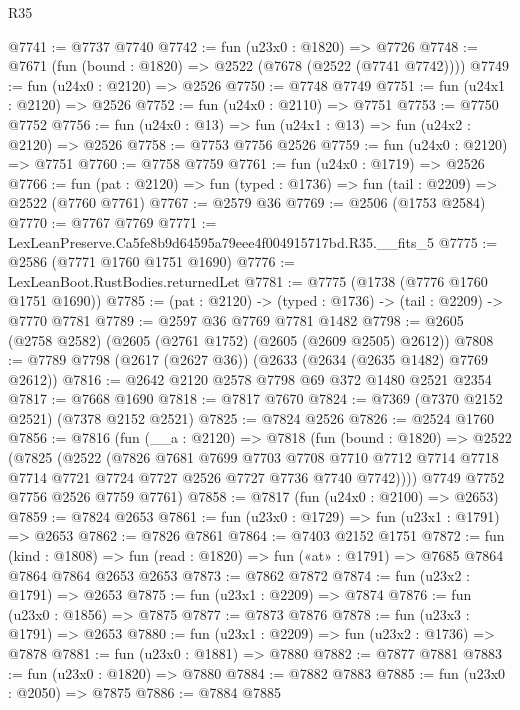 \begin{lexlean}{R35}
\begin{coremodule}
@7741 := @7737 @7740
@7742 := fun (u23x0 : @1820) => @7726
@7748 := @7671 (fun (bound : @1820) => @2522 (@7678 (@2522 (@7741 @7742))))
@7749 := fun (u24x0 : @2120) => @2526
@7750 := @7748 @7749
@7751 := fun (u24x1 : @2120) => @2526
@7752 := fun (u24x0 : @2110) => @7751
@7753 := @7750 @7752
@7756 := fun (u24x0 : @13) => fun (u24x1 : @13) => fun (u24x2 : @2120) => @2526
@7758 := @7753 @7756 @2526
@7759 := fun (u24x0 : @2120) => @7751
@7760 := @7758 @7759
@7761 := fun (u24x0 : @1719) => @2526
@7766 := fun (pat : @2120) => fun (typed : @1736) => fun (tail : @2209) => @2522 (@7760 @7761)
@7767 := @2579 @36
@7769 := @2506 (@1753 @2584)
@7770 := @7767 @7769
@7771 := LexLeanPreserve.Ca5fe8b9d64595a79eee4f004915717bd.R35.__fits_5
@7775 := @2586 (@7771 @1760 @1751 @1690)
@7776 := LexLeanBoot.RustBodies.returnedLet
@7781 := @7775 (@1738 (@7776 @1760 @1751 @1690))
@7785 := (pat : @2120) -> (typed : @1736) -> (tail : @2209) -> @7770 @7781
@7789 := @2597 @36 @7769 @7781 @1482
@7798 := @2605 (@2758 @2582) (@2605 (@2761 @1752) (@2605 (@2609 @2505) @2612))
@7808 := @7789 @7798 (@2617 (@2627 @36)) (@2633 (@2634 (@2635 @1482) @7769 @2612))
@7816 := @2642 @2120 @2578 @7798 @69 @372 @1480 @2521 @2354
@7817 := @7668 @1690
@7818 := @7817 @7670
@7824 := @7369 (@7370 @2152 @2521) (@7378 @2152 @2521)
@7825 := @7824 @2526
@7826 := @2524 @1760
@7856 := @7816
    (fun (__a : @2120) =>
    @7818
      (fun (bound : @1820) =>
      @2522
        (@7825
          (@2522
            (@7826
              @7681
              @7699
              @7703
              @7708
              @7710
              @7712
              @7714
              @7718
              @7714
              @7721
              @7724
              @7727
              @2526
              @7727
              @7736
              @7740
              @7742))))
      @7749
      @7752
      @7756
      @2526
      @7759
      @7761)
@7858 := @7817 (fun (u24x0 : @2100) => @2653)
@7859 := @7824 @2653
@7861 := fun (u23x0 : @1729) => fun (u23x1 : @1791) => @2653
@7862 := @7826 @7861
@7864 := @7403 @2152 @1751
@7872 := fun (kind : @1808) =>
  fun (read : @1820) => fun («at» : @1791) => @7685 @7864 @7864 @7864 @2653 @2653
@7873 := @7862 @7872
@7874 := fun (u23x2 : @1791) => @2653
@7875 := fun (u23x1 : @2209) => @7874
@7876 := fun (u23x0 : @1856) => @7875
@7877 := @7873 @7876
@7878 := fun (u23x3 : @1791) => @2653
@7880 := fun (u23x1 : @2209) => fun (u23x2 : @1736) => @7878
@7881 := fun (u23x0 : @1881) => @7880
@7882 := @7877 @7881
@7883 := fun (u23x0 : @1820) => @7880
@7884 := @7882 @7883
@7885 := fun (u23x0 : @2050) => @7875
@7886 := @7884 @7885

\end{coremodule}
\end{lexlean}
